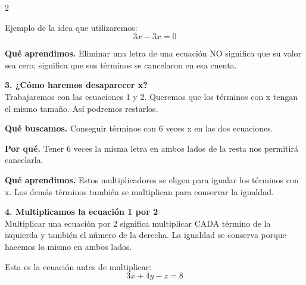 \documentclass[11pt,a4paper,landscape]{article}
\begin{document}
\begin{multicols*}{2}
\begin{minipage}{\linewidth}
\par\smallskip Ejemplo de la idea que utilizaremos:
\[3x-3x=0\]
\par\smallskip\textbf{Qué aprendimos.} Eliminar una letra de una ecuación NO significa que su valor sea cero; significa que sus términos se cancelaron en esa cuenta.
\end{minipage}\par\medskip
\noindent\begin{minipage}{\linewidth}\textbf{3. ¿Cómo haremos desaparecer x?}\\[2pt]Trabajaremos con las ecuaciones 1 y 2. Queremos que los términos con x tengan el mismo tamaño. Así podremos restarlos.
\par\smallskip\textbf{Qué buscamos.} Conseguir términos con 6 veces x en las dos ecuaciones.
\par\smallskip\textbf{Por qué.} Tener 6 veces la misma letra en ambos lados de la resta nos permitirá cancelarla.
\par{}\par\smallskip
\par\smallskip\textbf{Qué aprendimos.} Estos multiplicadores se eligen para igualar los términos con x. Los demás términos también se multiplican para conservar la igualdad.
\end{minipage}\par\medskip
\noindent\begin{minipage}{\linewidth}\textbf{4. Multiplicamos la ecuación 1 por 2}\\[2pt]Multiplicar una ecuación por 2 significa multiplicar CADA término de la izquierda y también el número de la derecha. La igualdad se conserva porque hacemos lo mismo en ambos lados.
\par\smallskip Esta es la ecuación antes de multiplicar:
\[3x + 4y - z = 8\]

\end{minipage}
\end{multicols*}
\end{document}
